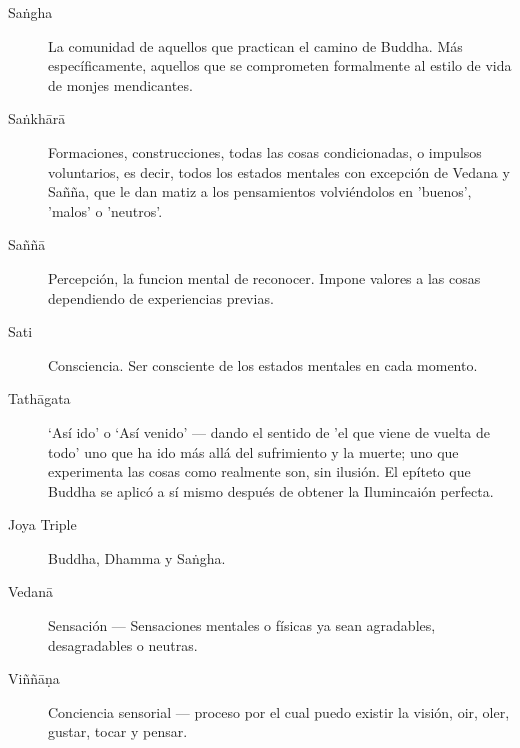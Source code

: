 \begin{description}
\item[Saṅgha] La comunidad de aquellos que practican el camino de Buddha.
  Más específicamente, aquellos que se comprometen formalmente al estilo de vida de monjes mendicantes.

\item[Saṅkhārā] Formaciones, construcciones, todas las cosas condicionadas, o impulsos voluntarios, es decir, todos los estados mentales con excepción de Vedana y Sañña, que le dan matiz a los pensamientos volviéndolos en 'buenos', 'malos' o 'neutros'.

\item[Saññā] Percepción, la funcion mental de reconocer. Impone valores a las cosas dependiendo de experiencias previas.

\item[Sati] Consciencia. Ser consciente de los estados mentales en cada momento.

\item[Tathāgata] ‘Así ido’ o ‘Así venido’ --- dando el sentido de 'el que viene de vuelta de todo' uno que ha ido más allá del sufrimiento y la muerte; uno que experimenta las cosas como realmente son, sin ilusión. El epíteto que Buddha se aplicó a sí mismo después de obtener la Ilumincaión perfecta.

\item[Joya Triple] Buddha, Dhamma y Saṅgha.

\item[Vedanā] Sensación --- Sensaciones mentales o físicas ya sean agradables, desagradables o neutras.

\item[Viññāṇa] Conciencia sensorial --- proceso por el cual puedo existir la visión, oir, oler, gustar, tocar y pensar.

\end{description}

